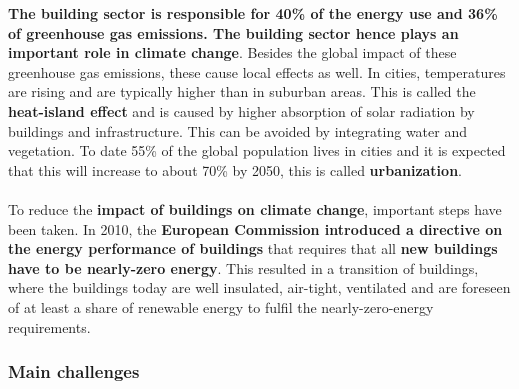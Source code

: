 \documentclass[../summary.tex]{subfiles}
\begin{document}
	\textbf{The building sector is responsible for 40\% of the energy use and 36\% of greenhouse gas emissions. The building sector hence plays an important role in climate change}. Besides the global impact of these greenhouse gas emissions, these cause local effects as well. In cities, temperatures are rising and are typically higher than in suburban areas. This is called the \textbf{heat-island effect} and is caused by higher absorption of solar radiation by buildings and infrastructure. This can be avoided by integrating water and vegetation. To date 55\% of the global population lives in cities and it is expected that this will increase to about 70\% by 2050, this is called \textbf{urbanization}.
	\\\\	
	To reduce the \textbf{impact of buildings on climate change}, important steps have been taken. In 2010, the \textbf{European Commission introduced a directive on the energy performance of buildings} that requires that all \textbf{new buildings have to be nearly-zero energy}. This resulted in a transition of buildings, where the buildings today are well insulated, air-tight, ventilated and are foreseen of at least a share of renewable energy to fulfil the nearly-zero-energy requirements. 
	
	\subsubsection{Main challenges}
	
\end{document}
